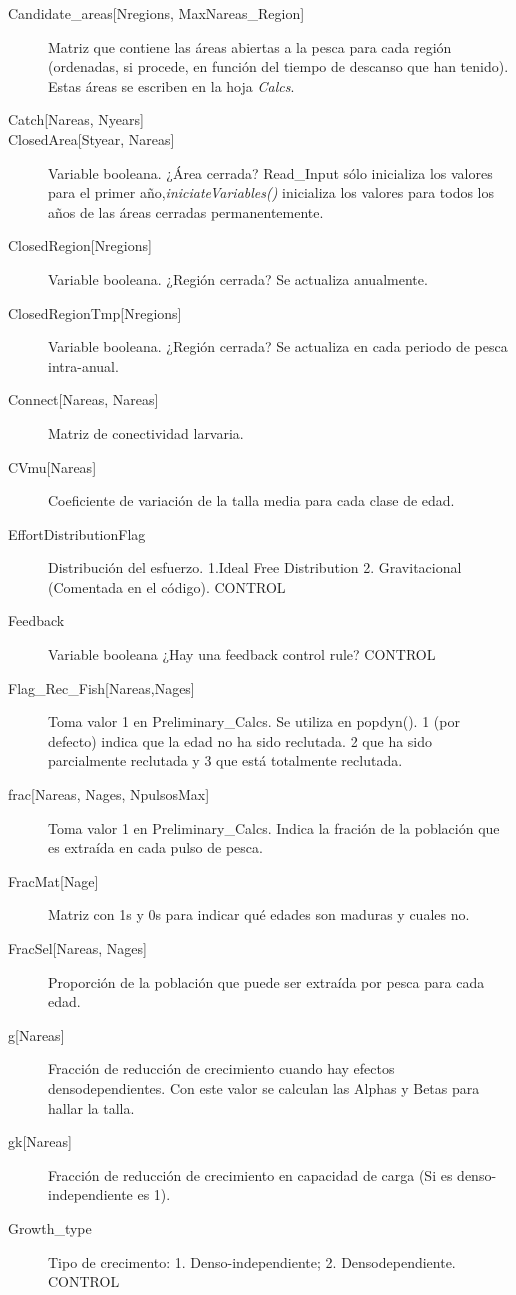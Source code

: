 \begin{description}
		
		\item[Candidate\_areas{[}Nregions, MaxNareas\_Region{]}] Matriz que contiene las áreas abiertas a la pesca para cada región (ordenadas, si procede, en función del tiempo de descanso que han tenido). Estas áreas se escriben en la hoja \emph{Calcs}.
		\item[Catch{[}Nareas, Nyears{]}]
		\item[ClosedArea{[}Styear, Nareas{]}] Variable booleana. ¿Área cerrada? Read\_Input sólo inicializa los valores para el primer año,\emph{iniciateVariables()} inicializa los valores para todos los años de las áreas cerradas permanentemente.
		\item[ClosedRegion{[}Nregions{]}] Variable booleana. ¿Región cerrada? Se actualiza anualmente.
		\item[ClosedRegionTmp{[}Nregions{]}] Variable booleana. ¿Región cerrada? Se actualiza en cada periodo de pesca intra-anual.		
		\item[Connect{[}Nareas, Nareas{]}] Matriz de conectividad larvaria.
		\item[CVmu{[}Nareas{]}] Coeficiente de variación de la talla media para cada clase de edad.
		
		\item[EffortDistributionFlag] Distribución del esfuerzo. 1.Ideal Free Distribution 2. Gravitacional (Comentada en el código). CONTROL
		
		\item[Feedback] Variable booleana ¿Hay una feedback control rule? CONTROL
		\item[Flag\_Rec\_Fish{[}Nareas,Nages{]}] Toma valor 1 en Preliminary\_Calcs. Se utiliza en popdyn(). 1 (por defecto) indica que la edad no ha sido reclutada. 2 que ha sido parcialmente reclutada y 3 que está totalmente reclutada.
		\item[frac{[}Nareas, Nages, NpulsosMax{]}] Toma valor 1 en Preliminary\_Calcs. Indica la fración de la población que es extraída en cada pulso de pesca.
		\item[FracMat{[}Nage{]}] Matriz con 1s y 0s para indicar qué edades son maduras y cuales no. 
		\item[FracSel{[}Nareas, Nages{]}] Proporción de la población que puede ser extraída por pesca para cada edad. 
		   
		\item[g{[}Nareas{]}] Fracción de reducción de crecimiento cuando hay efectos densodependientes. Con este valor se calculan las Alphas y Betas para hallar la talla.
		\item[gk{[}Nareas{]}] Fracción de reducción de crecimiento en capacidad de carga (Si es denso-independiente es 1).
		\item[Growth\_type] Tipo de crecimento: 1. Denso-independiente; 2. Densodependiente. CONTROL
		

\end{description}
